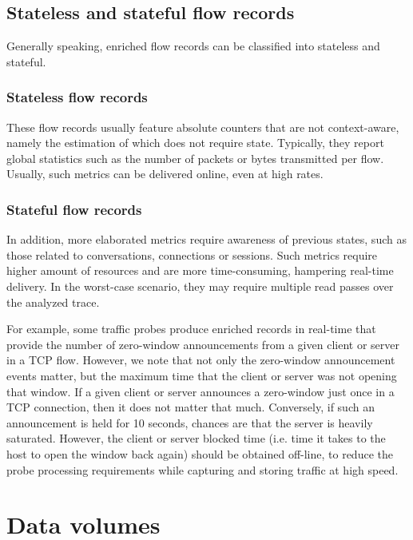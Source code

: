 \documentclass[AMA,STIX1COL]{WileyNJD-v2}
\begin{document}
\subsection{Stateless and stateful flow records}

Generally speaking, enriched flow records can be classified into stateless and stateful.

\subsubsection{Stateless flow records}
These flow records usually feature absolute counters that are not context-aware, namely the estimation of which does not require state. Typically, they report global statistics such as the number of packets or bytes transmitted per flow. Usually, such metrics can be delivered online, even at high rates.  %

\subsubsection{Stateful flow records}
In addition, more elaborated metrics require awareness of previous states, such as those related to conversations, connections or sessions. Such metrics require higher amount of resources and are more time-consuming, hampering real-time delivery. In the worst-case scenario, they may require multiple read passes over the analyzed trace.

For example, some traffic probes\cite{M3OMON} produce enriched records in real-time that provide the number of zero-window announcements from a given client or server in a TCP flow. However, we note that not only the zero-window announcement events matter, but the maximum time that the client or server was not opening that window. If a given client or server announces a zero-window just once in a TCP connection, then it does not matter that much. Conversely, if such an announcement is held for 10 seconds, chances are that the server is heavily saturated.
However, the client or server blocked time (i.e. time it takes to the host to open the window back again) should be obtained off-line, to reduce the probe processing requirements while capturing and storing traffic at high speed.

\section{Data volumes}
\label{sec:design}
\end{document}
